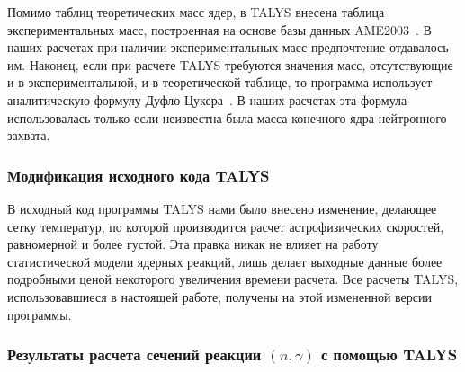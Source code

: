 Помимо таблиц теоретических масс ядер, в TALYS внесена таблица экспериментальных масс, построенная на основе базы данных AME2003~\cite{wapstra2003}. В наших расчетах при наличии экспериментальных масс предпочтение отдавалось им. Наконец, если при расчете TALYS требуются значения масс, отсутствующие и в экспериментальной, и в теоретической таблице, то программа использует аналитическую формулу Дуфло-Цукера~\cite{duflo1995}. В наших расчетах эта формула использовалась только если неизвестна была масса конечного ядра нейтронного захвата.

\subsubsection{Модификация исходного кода TALYS}
В исходный код программы TALYS нами было внесено изменение, делающее сетку температур, по которой производится расчет астрофизических скоростей, равномерной и более густой. Эта правка никак не влияет на работу статистической модели ядерных реакций, лишь делает выходные данные более подробными ценой некоторого увеличения времени расчета. Все расчеты TALYS, использовавшиеся в настоящей работе, получены на этой измененной версии программы.  

\subsubsection{Результаты расчета сечений реакции $(n,\gamma)$ с помощью TALYS}

